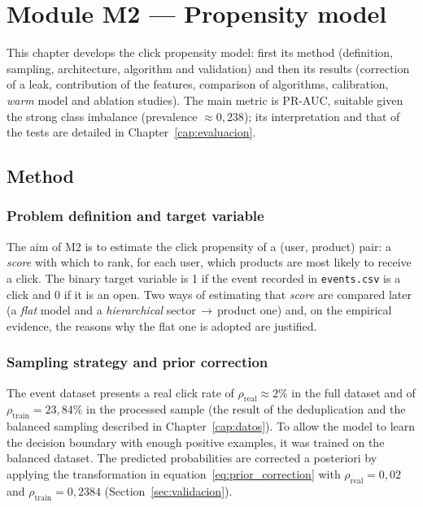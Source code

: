 \chapter{Module M2 — Propensity model}
\label{cap:propension}

This chapter develops the click propensity model: first its method (definition, sampling, architecture, algorithm and validation) and then its results (correction of a leak, contribution of the features, comparison of algorithms, calibration, \textit{warm} model and ablation studies). The main metric is PR-AUC, suitable given the strong class imbalance (prevalence $\approx0{,}238$); its interpretation and that of the tests are detailed in Chapter~\ref{cap:evaluacion}.

\section{Method}

\subsection{Problem definition and target variable}

The aim of M2 is to estimate the click propensity of a (user, product) pair: a \textit{score} with which to rank, for each user, which products are most likely to receive a click. The binary target variable is 1 if the event recorded in \texttt{events.csv} is a click and 0 if it is an open. Two ways of estimating that \textit{score} are compared later (a \emph{flat} model and a \emph{hierarchical} sector\,$\rightarrow$\,product one) and, on the empirical evidence, the reasons why the flat one is adopted are justified.

\subsection{Sampling strategy and prior correction}

The event dataset presents a real click rate of $\rho_\text{real} \approx 2\%$ in the full dataset and of $\rho_\text{train} = 23{,}84\%$ in the processed sample (the result of the deduplication and the balanced sampling described in Chapter~\ref{cap:datos}). To allow the model to learn the decision boundary with enough positive examples, it was trained on the balanced dataset. The predicted probabilities are corrected a posteriori by applying the transformation in equation~\ref{eq:prior_correction} with $\rho_\text{real}=0{,}02$ and $\rho_\text{train}=0{,}2384$ (Section~\ref{sec:validacion}).


